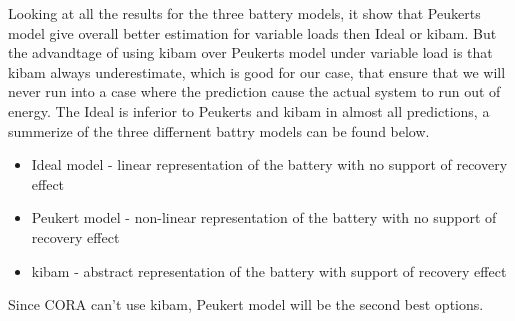 Looking at all the results for the three battery models, it show that Peukerts model give overall better estimation for variable loads then Ideal or \gls{kibam}. But the advandtage of using \gls{kibam} over Peukerts model under variable load is that \gls{kibam} always underestimate, which is good for our case, that ensure that we will never run into a case where the prediction cause the actual system to run out of energy. The Ideal is inferior to Peukerts and \gls{kibam} in almost all predictions, a summerize of the three differnent battry models can be found below.
\begin{itemize}
	\item Ideal model - linear representation of the battery with no support of recovery effect
	\item Peukert model - non-linear representation of the battery with no support of recovery effect
	\item \gls{kibam} - abstract representation of the battery with support of recovery effect
\end{itemize}
Since CORA can't use \gls{kibam}, Peukert model will be the second best options.





